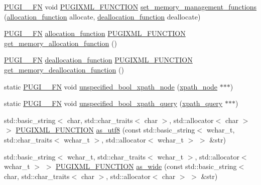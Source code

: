 \begin{DoxyCompactItemize}
\item 
\hyperlink{pugixml_8cpp_a82c335af3ca48cdb209c506bf8dd6ad2}{P\+U\+G\+I\+\_\+\+\_\+\+FN} void \hyperlink{pugixml_8hpp_a3d91f8ab11645e6dac8783d86d152b31}{P\+U\+G\+I\+X\+M\+L\+\_\+\+F\+U\+N\+C\+T\+I\+ON} \hyperlink{namespacepugi_abc67229fed7dbe24a410d83b9233f916}{set\+\_\+memory\+\_\+management\+\_\+functions} (\hyperlink{namespacepugi_a7b2d97e5b6040fe323d342268b6ffd4b}{allocation\+\_\+function} allocate, \hyperlink{namespacepugi_a3587161b9f8d7ac4ac2d6a45b82462be}{deallocation\+\_\+function} deallocate)
\item 
\hyperlink{pugixml_8cpp_a82c335af3ca48cdb209c506bf8dd6ad2}{P\+U\+G\+I\+\_\+\+\_\+\+FN} \hyperlink{namespacepugi_a7b2d97e5b6040fe323d342268b6ffd4b}{allocation\+\_\+function} \hyperlink{pugixml_8hpp_a3d91f8ab11645e6dac8783d86d152b31}{P\+U\+G\+I\+X\+M\+L\+\_\+\+F\+U\+N\+C\+T\+I\+ON} \hyperlink{namespacepugi_a0d3d42320b07fe1865feb5e8e7c01e38}{get\+\_\+memory\+\_\+allocation\+\_\+function} ()
\item 
\hyperlink{pugixml_8cpp_a82c335af3ca48cdb209c506bf8dd6ad2}{P\+U\+G\+I\+\_\+\+\_\+\+FN} \hyperlink{namespacepugi_a3587161b9f8d7ac4ac2d6a45b82462be}{deallocation\+\_\+function} \hyperlink{pugixml_8hpp_a3d91f8ab11645e6dac8783d86d152b31}{P\+U\+G\+I\+X\+M\+L\+\_\+\+F\+U\+N\+C\+T\+I\+ON} \hyperlink{namespacepugi_a0823c1cb767482d9d72d1df055be3b67}{get\+\_\+memory\+\_\+deallocation\+\_\+function} ()
\item 
static \hyperlink{pugixml_8cpp_a82c335af3ca48cdb209c506bf8dd6ad2}{P\+U\+G\+I\+\_\+\+\_\+\+FN} void \hyperlink{namespacepugi_abca519e72b848d2ebadf5250727da6c5}{unspecified\+\_\+bool\+\_\+xpath\+\_\+node} (\hyperlink{classpugi_1_1xpath__node}{xpath\+\_\+node} $\ast$$\ast$$\ast$)
\item 
static \hyperlink{pugixml_8cpp_a82c335af3ca48cdb209c506bf8dd6ad2}{P\+U\+G\+I\+\_\+\+\_\+\+FN} void \hyperlink{namespacepugi_a41b925609dde7657664cf68c6506838b}{unspecified\+\_\+bool\+\_\+xpath\+\_\+query} (\hyperlink{classpugi_1_1xpath__query}{xpath\+\_\+query} $\ast$$\ast$$\ast$)
\item 
std\+::basic\+\_\+string$<$ char, std\+::char\+\_\+traits$<$ char $>$, std\+::allocator$<$ char $>$ $>$ \hyperlink{pugixml_8hpp_a3d91f8ab11645e6dac8783d86d152b31}{P\+U\+G\+I\+X\+M\+L\+\_\+\+F\+U\+N\+C\+T\+I\+ON} \hyperlink{namespacepugi_a4167cd183b5a524d0310df50caa44a80}{as\+\_\+utf8} (const std\+::basic\+\_\+string$<$ wchar\+\_\+t, std\+::char\+\_\+traits$<$ wchar\+\_\+t $>$, std\+::allocator$<$ wchar\+\_\+t $>$ $>$ \&str)
\item 
std\+::basic\+\_\+string$<$ wchar\+\_\+t, std\+::char\+\_\+traits$<$ wchar\+\_\+t $>$, std\+::allocator$<$ wchar\+\_\+t $>$ $>$ \hyperlink{pugixml_8hpp_a3d91f8ab11645e6dac8783d86d152b31}{P\+U\+G\+I\+X\+M\+L\+\_\+\+F\+U\+N\+C\+T\+I\+ON} \hyperlink{namespacepugi_a14a429e10cd9296114544306b7228d09}{as\+\_\+wide} (const std\+::basic\+\_\+string$<$ char, std\+::char\+\_\+traits$<$ char $>$, std\+::allocator$<$ char $>$ $>$ \&str)
\end{DoxyCompactItemize}
